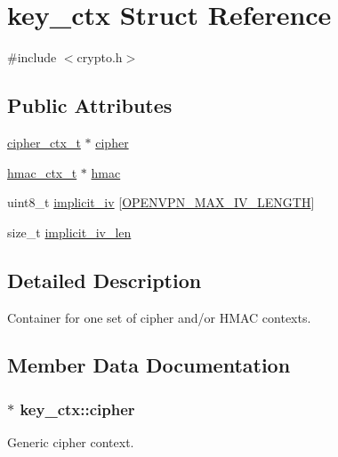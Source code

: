 \hypertarget{structkey__ctx}{}\section{key\+\_\+ctx Struct Reference}
\label{structkey__ctx}


{\ttfamily \#include $<$crypto.\+h$>$}

\subsection*{Public Attributes}
\begin{DoxyCompactItemize}
\item 
\hyperlink{crypto__mbedtls_8h_a5fd03a052e0b72cb24747f7cccfc66dd}{cipher\+\_\+ctx\+\_\+t} $\ast$ \hyperlink{structkey__ctx_aae41ef2b9e31ab2da86e7926cceed175}{cipher}
\item 
\hyperlink{crypto__mbedtls_8h_a673f50867e637575e463123b9a6b8180}{hmac\+\_\+ctx\+\_\+t} $\ast$ \hyperlink{structkey__ctx_ac82e9ac5970ca208fa7d36c9a49bb4a7}{hmac}
\item 
uint8\+\_\+t \hyperlink{structkey__ctx_a3abf80e0721314aa5ae121fa668620a7}{implicit\+\_\+iv} \mbox{[}\hyperlink{crypto__openssl_8h_ae9cda5ecb2fa1ec97a413d9ffbb0c87e}{O\+P\+E\+N\+V\+P\+N\+\_\+\+M\+A\+X\+\_\+\+I\+V\+\_\+\+L\+E\+N\+G\+T\+H}\mbox{]}
\item 
size\+\_\+t \hyperlink{structkey__ctx_a094aa3b3f35e7d15ac58d5e4ef072eaa}{implicit\+\_\+iv\+\_\+len}
\end{DoxyCompactItemize}


\subsection{Detailed Description}
Container for one set of cipher and/or H\+M\+A\+C contexts. 

\subsection{Member Data Documentation}
\hypertarget{structkey__ctx_aae41ef2b9e31ab2da86e7926cceed175}{}
\subsubsection[{cipher}]{$\ast$ key\+\_\+ctx\+::cipher}\label{structkey__ctx_aae41ef2b9e31ab2da86e7926cceed175}
Generic cipher context. \hypertarget{structkey__ctx_ac82e9ac5970ca208fa7d36c9a49bb4a7}{}
